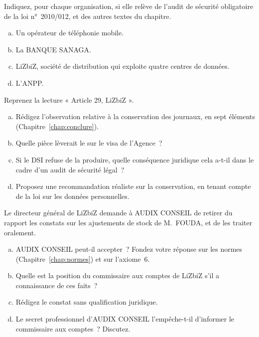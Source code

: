 \bigskip

\begin{boxexo}[title={\ding{45}\quad Exercice~12.1. Assujetti ou non~? \niveaubase}]
Indiquez, pour chaque organisation, si elle relève de l'audit de sécurité
obligatoire de la loi n°~2010/012, et des autres textes du chapitre.
\begin{enumerate}[(a)]
    \item Un opérateur de téléphonie mobile.
    \item La BANQUE SANAGA.
    \item LiZbiZ, société de distribution qui exploite quatre centres de
          données.
    \item L'ANPP.
\end{enumerate}
\end{boxexo}

\begin{boxexo}[title={\ding{45}\quad Exercice~12.2. Rédiger un constat légal \niveaumoyen}]
Reprenez la lecture « Article 29, LiZbiZ ».
\begin{enumerate}[(a)]
    \item Rédigez l'observation relative à la conservation des journaux, en
          sept éléments (Chapitre~\ref{chap:conclure}).
    \item Quelle pièce lèverait le \NEK{} sur le visa de l'Agence~?
    \item Si le DSI refuse de la produire, quelle conséquence juridique
          cela a-t-il dans le cadre d'un audit de sécurité légal~?
    \item Proposez une recommandation réaliste sur la conservation, en
          tenant compte de la loi sur les données personnelles.
\end{enumerate}
\end{boxexo}

\begin{boxexo}[title={\ding{45}\quad Exercice~12.3. Taire ou révéler~? \niveauexpert}]
Le directeur général de LiZbiZ demande à AUDIX CONSEIL de retirer du rapport
les constats sur les ajustements de stock de M.~FOUDA, et de les traiter
oralement.
\begin{enumerate}[(a)]
    \item AUDIX CONSEIL peut-il accepter~? Fondez votre réponse sur les
          normes (Chapitre~\ref{chap:normes}) et sur l'axiome~6.
    \item Quelle est la position du commissaire aux comptes de LiZbiZ s'il
          a connaissance de ces faits~?
    \item Rédigez le constat sans qualification juridique.
    \item Le secret professionnel d'AUDIX CONSEIL l'empêche-t-il
          d'informer le commissaire aux comptes~? Discutez.
\end{enumerate}
\end{boxexo}

